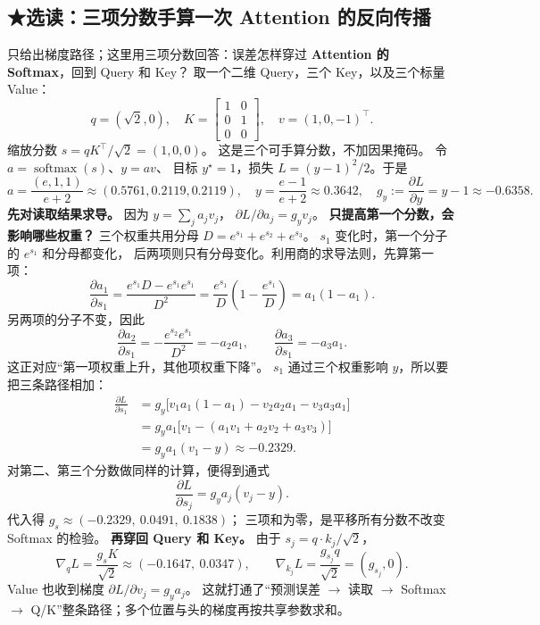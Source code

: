 \subsection{\texorpdfstring{{\symboliconfont ★}}{★}选读：三项分数手算一次 Attention 的反向传播}
\label{sec:attention-backward-three-scores}
只给出梯度路径；这里用三项分数回答：误差怎样穿过
\textbf{Attention 的 Softmax}，回到 Query 和 Key？
取一个二维 Query，三个 Key，以及三个标量 Value：
\[
q=(\sqrt2,0),\quad
K=\begin{bmatrix}1&0\\0&1\\0&0\end{bmatrix},\quad
v=(1,0,-1)^\top.
\]
缩放分数 $s=qK^\top/\sqrt2=(1,0,0)$。
这是三个可手算分数，不加因果掩码。
令 $a=\operatorname{softmax}(s)$、$y=av$、
目标 $y^\star=1$，损失 $L=(y-1)^2/2$。于是
\[
a=\frac{(e,1,1)}{e+2}\approx(0.5761,0.2119,0.2119),
\quad y=\frac{e-1}{e+2}\approx0.3642,\quad
g_y:=\frac{\partial L}{\partial y}=y-1\approx-0.6358.
\]
\textbf{先对读取结果求导。}
因为 $y=\sum_j a_jv_j$，
$\partial L/\partial a_j=g_yv_j$。
\textbf{只提高第一个分数，会影响哪些权重？}
三个权重共用分母 $D=e^{s_1}+e^{s_2}+e^{s_3}$。
$s_1$ 变化时，第一个分子的 $e^{s_1}$ 和分母都变化，
后两项则只有分母变化。利用商的求导法则，先算第一项：
\[
\frac{\partial a_1}{\partial s_1}
=\frac{e^{s_1}D-e^{s_1}e^{s_1}}{D^2}
=\frac{e^{s_1}}D\left(1-\frac{e^{s_1}}D\right)=a_1(1-a_1).
\]
另两项的分子不变，因此
\[
\frac{\partial a_2}{\partial s_1}=-\frac{e^{s_2}e^{s_1}}{D^2}=-a_2a_1,
\qquad
\frac{\partial a_3}{\partial s_1}=-a_3a_1.
\]
这正对应“第一项权重上升，其他项权重下降”。
$s_1$ 通过三个权重影响 $y$，所以要把三条路径相加：
\[
\begin{aligned}
\frac{\partial L}{\partial s_1}
&=g_y\bigl[v_1a_1(1-a_1)-v_2a_2a_1-v_3a_3a_1\bigr]\\
&=g_ya_1\bigl[v_1-(a_1v_1+a_2v_2+a_3v_3)\bigr]\\
&=g_ya_1(v_1-y)\approx\boxed{-0.2329}.
\end{aligned}
\]
对第二、第三个分数做同样的计算，便得到通式
\begin{equation}
\boxed{\frac{\partial L}{\partial s_j}
=g_ya_j(v_j-y).}
\label{eq:attention-softmax-backward}
\end{equation}
代入得 $g_s\approx(-0.2329,\ 0.0491,\ 0.1838)$；
三项和为零，是平移所有分数不改变 Softmax 的检验。
\textbf{再穿回 Query 和 Key。}
由于 $s_j=q\cdot k_j/\sqrt2$，
\[
\boxed{\nabla_qL=\frac{g_sK}{\sqrt2}
\approx(-0.1647,\ 0.0347)},\qquad
\boxed{\nabla_{k_j}L=\frac{g_{s_j}q}{\sqrt2}
=(g_{s_j},0).}
\]
Value 也收到梯度 $\partial L/\partial v_j=g_ya_j$。
这就打通了“预测误差 $\to$ 读取 $\to$ Softmax
$\to$ Q/K”整条路径；多个位置与头的梯度再按共享参数求和。

